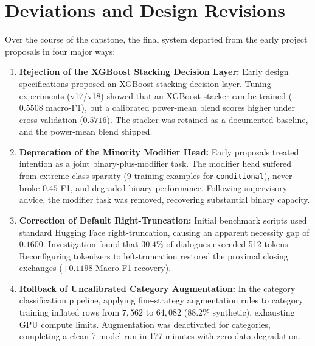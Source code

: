 \section{Deviations and Design Revisions}
\label{sec:revisions}

Over the course of the capstone, the final system departed from the early project proposals in four major ways:
\begin{enumerate}
  \item \textbf{Rejection of the XGBoost Stacking Decision Layer:} Early design specifications proposed an XGBoost stacking decision layer. Tuning experiments (v17/v18) showed that an XGBoost stacker can be trained ($0.5508$ macro-F1), but a calibrated power-mean blend scores higher under cross-validation ($0.5716$). The stacker was retained as a documented baseline, and the power-mean blend shipped.
  \item \textbf{Deprecation of the Minority Modifier Head:} Early proposals treated intention as a joint binary-plus-modifier task. The modifier head suffered from extreme class sparsity (9 training examples for \texttt{conditional}), never broke $0.45$ F1, and degraded binary performance. Following supervisory advice, the modifier task was removed, recovering substantial binary capacity.
  \item \textbf{Correction of Default Right-Truncation:} Initial benchmark scripts used standard Hugging Face right-truncation, causing an apparent necessity gap of $0.1600$. Investigation found that $30.4\%$ of dialogues exceeded 512 tokens. Reconfiguring tokenizers to left-truncation restored the proximal closing exchanges ($+0.1198$ Macro-F1 recovery).
  \item \textbf{Rollback of Uncalibrated Category Augmentation:} In the category classification pipeline, applying fine-strategy augmentation rules to category training inflated rows from $7{,}562$ to $64{,}082$ ($88.2\%$ synthetic), exhausting GPU compute limits. Augmentation was deactivated for categories, completing a clean 7-model run in 177 minutes with zero data degradation.
\end{enumerate}
